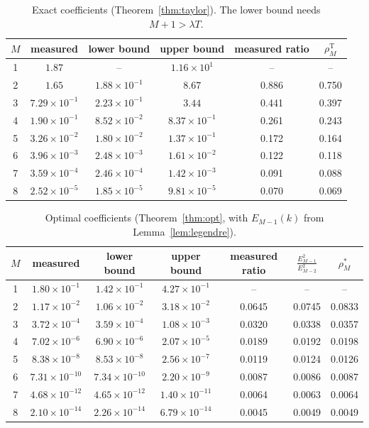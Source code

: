 \documentclass[11pt]{article}
\theoremstyle{remark}
\begin{document}
\begin{table}[h]
\centering
\caption{Exact coefficients (Theorem~\ref{thm:taylor}). The lower bound needs $M+1>\lambda T$.}
\label{tab:taylor}
\begin{tabular}{c c c c c c}
\toprule
$M$ & measured & lower bound & upper bound & measured ratio & $\rho^{\mathrm T}_M$ \\
\midrule
1 & $1.87$                & --                    & $1.16\times10^{1}$    & --     & --     \\
2 & $1.65$                & $1.88\times10^{-1}$   & $8.67$                & 0.886  & 0.750  \\
3 & $7.29\times10^{-1}$   & $2.23\times10^{-1}$   & $3.44$                & 0.441  & 0.397  \\
4 & $1.90\times10^{-1}$   & $8.52\times10^{-2}$   & $8.37\times10^{-1}$   & 0.261  & 0.243  \\
5 & $3.26\times10^{-2}$   & $1.80\times10^{-2}$   & $1.37\times10^{-1}$   & 0.172  & 0.164  \\
6 & $3.96\times10^{-3}$   & $2.48\times10^{-3}$   & $1.61\times10^{-2}$   & 0.122  & 0.118  \\
7 & $3.59\times10^{-4}$   & $2.46\times10^{-4}$   & $1.42\times10^{-3}$   & 0.091  & 0.088  \\
8 & $2.52\times10^{-5}$   & $1.85\times10^{-5}$   & $9.81\times10^{-5}$   & 0.070  & 0.069  \\
\bottomrule
\end{tabular}
\end{table}

\begin{table}[h]
\centering
\caption{Optimal coefficients (Theorem~\ref{thm:opt}, with $E_{M-1}(k)$ from Lemma~\ref{lem:legendre}).}
\label{tab:opt}
\begin{tabular}{c c c c c c c}
\toprule
$M$ & measured & lower bound & upper bound & measured ratio & $\frac{E_{M-1}^2}{E_{M-2}^2}$ & $\rho^{*}_M$ \\
\midrule
1 & $1.80\times10^{-1}$  & $1.42\times10^{-1}$  & $4.27\times10^{-1}$  & --     & --     & --     \\
2 & $1.17\times10^{-2}$  & $1.06\times10^{-2}$  & $3.18\times10^{-2}$  & 0.0645 & 0.0745 & 0.0833 \\
3 & $3.72\times10^{-4}$  & $3.59\times10^{-4}$  & $1.08\times10^{-3}$  & 0.0320 & 0.0338 & 0.0357 \\
4 & $7.02\times10^{-6}$  & $6.90\times10^{-6}$  & $2.07\times10^{-5}$  & 0.0189 & 0.0192 & 0.0198 \\
5 & $8.38\times10^{-8}$  & $8.53\times10^{-8}$  & $2.56\times10^{-7}$  & 0.0119 & 0.0124 & 0.0126 \\
6 & $7.31\times10^{-10}$ & $7.34\times10^{-10}$ & $2.20\times10^{-9}$  & 0.0087 & 0.0086 & 0.0087 \\
7 & $4.68\times10^{-12}$ & $4.65\times10^{-12}$ & $1.40\times10^{-11}$ & 0.0064 & 0.0063 & 0.0064 \\
8 & $2.10\times10^{-14}$ & $2.26\times10^{-14}$ & $6.79\times10^{-14}$ & 0.0045 & 0.0049 & 0.0049 \\
\bottomrule
\end{tabular}
\end{table}
\end{document}
